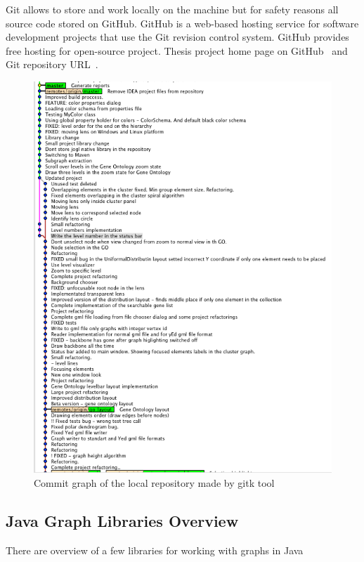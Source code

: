 Git allows to store and work locally on the machine but for safety reasons all source code stored on GitHub.
GitHub is a web-based hosting service for software development projects that use the Git revision control system.
GitHub provides free hosting for open-source project. Thesis project home page on GitHub~\cite{GitHub_homepage} and Git repository URL~\cite{GitHub_repository}.

\begin{figure}[h!]
\centering
\includegraphics[scale=0.6]{pictures/commit_graph_gitk.png}
\caption{Commit graph of the local repository made by gitk tool}
\end{figure}


\subsection{Java Graph Libraries Overview}


There are overview of a few libraries for working with graphs in Java

